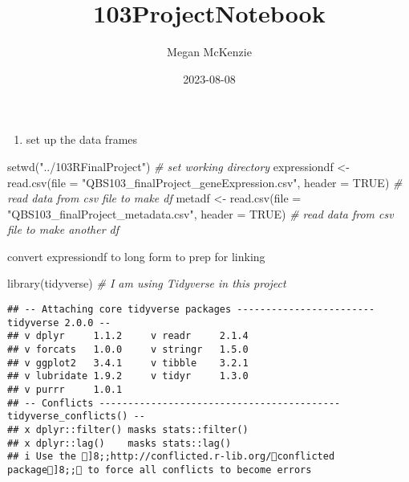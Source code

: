 \documentclass[
]{article}
\title{103ProjectNotebook}
\author{Megan McKenzie}
\date{2023-08-08}
\newenvironment{Shaded}{\begin{snugshade}}{\end{snugshade}}
\newcommand{\AttributeTok}[1]{\textcolor[rgb]{0.77,0.63,0.00}{#1}}
\newcommand{\CommentTok}[1]{\textcolor[rgb]{0.56,0.35,0.01}{\textit{#1}}}
\newcommand{\ConstantTok}[1]{\textcolor[rgb]{0.00,0.00,0.00}{#1}}
\newcommand{\FunctionTok}[1]{\textcolor[rgb]{0.00,0.00,0.00}{#1}}
\newcommand{\NormalTok}[1]{#1}
\newcommand{\OtherTok}[1]{\textcolor[rgb]{0.56,0.35,0.01}{#1}}
\newcommand{\StringTok}[1]{\textcolor[rgb]{0.31,0.60,0.02}{#1}}
\providecommand{\tightlist}{%
  \setlength{\itemsep}{0pt}\setlength{\parskip}{0pt}}
\begin{document}
\maketitle

\begin{enumerate}
\def\labelenumi{\arabic{enumi}.}
\tightlist
\item
  set up the data frames
\end{enumerate}

\begin{Shaded}
\begin{Highlighting}[]
\FunctionTok{setwd}\NormalTok{(}\StringTok{"../103RFinalProject"}\NormalTok{) }\CommentTok{\# set working directory}
\NormalTok{expressiondf }\OtherTok{\textless{}{-}} \FunctionTok{read.csv}\NormalTok{(}\AttributeTok{file =} \StringTok{"QBS103\_finalProject\_geneExpression.csv"}\NormalTok{, }\AttributeTok{header =} \ConstantTok{TRUE}\NormalTok{) }\CommentTok{\# read data from csv file to make df}
\NormalTok{metadf }\OtherTok{\textless{}{-}} \FunctionTok{read.csv}\NormalTok{(}\AttributeTok{file =} \StringTok{"QBS103\_finalProject\_metadata.csv"}\NormalTok{, }\AttributeTok{header =} \ConstantTok{TRUE}\NormalTok{) }\CommentTok{\# read data from csv file to make another df}
\end{Highlighting}
\end{Shaded}

convert expressiondf to long form to prep for linking

\begin{Shaded}
\begin{Highlighting}[]
\FunctionTok{library}\NormalTok{(tidyverse) }\CommentTok{\# I am using Tidyverse in this project}
\end{Highlighting}
\end{Shaded}

\begin{verbatim}
## -- Attaching core tidyverse packages ------------------------ tidyverse 2.0.0 --
## v dplyr     1.1.2     v readr     2.1.4
## v forcats   1.0.0     v stringr   1.5.0
## v ggplot2   3.4.1     v tibble    3.2.1
## v lubridate 1.9.2     v tidyr     1.3.0
## v purrr     1.0.1     
## -- Conflicts ------------------------------------------ tidyverse_conflicts() --
## x dplyr::filter() masks stats::filter()
## x dplyr::lag()    masks stats::lag()
## i Use the ]8;;http://conflicted.r-lib.org/conflicted package]8;; to force all conflicts to become errors
\end{verbatim}
\end{document}
